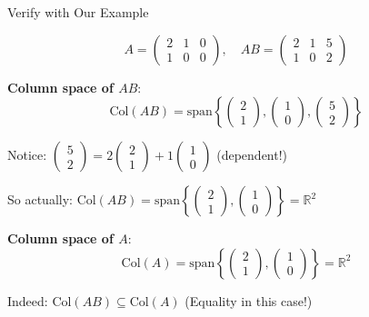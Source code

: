 \documentclass[10pt]{beamer}
\theoremstyle{definition}
\newcommand{\x}[1]{\alert{\textbf{#1}}}
\begin{document}
\begin{frame}{Verify with Our Example}

$$A = \begin{pmatrix} 2 & 1 & 0 \\ 1 & 0 & 0 \end{pmatrix}, \quad AB = \begin{pmatrix} 2 & 1 & 5 \\ 1 & 0 & 2 \end{pmatrix}$$

\x{Column space of $AB$}:
$$\text{Col}(AB) = \text{span}\left\{\begin{pmatrix} 2\\1 \end{pmatrix}, \begin{pmatrix} 1\\0 \end{pmatrix}, \begin{pmatrix} 5\\2 \end{pmatrix}\right\}$$

Notice: $\begin{pmatrix} 5\\2 \end{pmatrix} = 2\begin{pmatrix} 2\\1 \end{pmatrix} + 1\begin{pmatrix} 1\\0 \end{pmatrix}$ (dependent!)

So actually: $\text{Col}(AB) = \text{span}\left\{\begin{pmatrix} 2\\1 \end{pmatrix}, \begin{pmatrix} 1\\0 \end{pmatrix}\right\} = \mathbb{R}^2$

\x{Column space of $A$}:
$$\text{Col}(A) = \text{span}\left\{\begin{pmatrix} 2\\1 \end{pmatrix}, \begin{pmatrix} 1\\0 \end{pmatrix}\right\} = \mathbb{R}^2$$

Indeed: $\text{Col}(AB) \subseteq \text{Col}(A)$ \checkmark \quad (Equality in this case!)

\end{frame}
\end{document}
